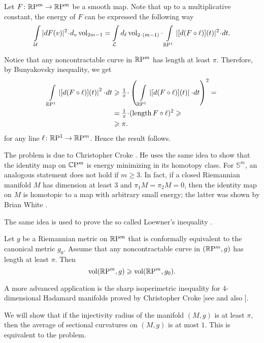 Let $F\colon\mathbb{R}\mathrm{P}^m\to\mathbb{R}\mathrm{P}^m$ be a smooth map.
Note that up to a multiplicative constant,
the energy of $F$ can be expressed the following way
\[\int\limits_{\mathcal{U}} |dF(v)|^2\cdot d_v\vol_{2m-1}
=
\int\limits_{\mathcal{L}}d_\ell\vol_{2\cdot(m-1)}\cdot\int\limits_{\RP^1} |[d(F\circ \ell)](t)|^2\cdot dt.\]

Notice that any noncontractable curve in $\mathbb{R}\mathrm{P}^m$ has length at least $\pi$.
Therefore, by Bunyakovsky inequality, we get
\begin{align*}
\int\limits_{\RP^1} \left|[d(F\circ \ell)](t)\right|^2\cdot dt&\ge 
\tfrac1\pi\cdot \left(\,\int\limits_{\RP^1} \left|[d(F\circ \ell)](t)\right|\cdot dt\right)^2=
\\
&=\tfrac1\pi\cdot (\length F\circ\ell)^2\ge
\\
&\ge \pi.
\end{align*}
for any line $\ell\colon\mathbb{R}\mathrm{P}^1\to \mathbb{R}\mathrm{P}^m$.
Hence the result follows.\qeds

\label{page:liouville}
The problem is due to Christopher Croke \cite{croke-energy}. 
He uses the same idea to show that the identity map on $\mathbb{C}\mathrm{P}^m$ is energy minimizing in its homotopy class.
For $\mathbb S^m$, an analogous statement does not hold if $m\ge 3$.
In fact, 
if a closed Riemannian manifold $M$ 
has dimension at least 3 
and $\pi_1M=\pi_2M=0$,
then the identity map on $M$ is homotopic 
to a map with arbitrary small energy;
the latter was shown by Brian White \cite{white}.

The same idea is used to prove the so called Loewner's inequality \cite{gromov-filling}.
\begin{pr}
Let $g$ be a Riemannian metric on $\mathbb{R}\mathrm{P}^m$ that is conformally equivalent to the canonical metric $g_0$.
Assume that any noncontractable curve in $(\mathbb{R}\mathrm{P}^m,g)$ has length at least $\pi$.
Then
\[\operatorname{\rm vol}\nolimits(\mathbb{R}\mathrm{P}^m,g)\geqslant\operatorname{\rm vol}\nolimits(\mathbb{R}\mathrm{P}^m,g_0).\]

\end{pr}

A more advanced application is the sharp isoperimetric inequality for 
4-dimensional Hadamard manifolds proved by Christopher Croke [see  and also ].





We will show that 
if the injectivity radius of the manifold $(M,g)$ is at least $\pi$,
then the average of sectional curvatures on $(M,g)$ is at most $1$.
This is equivalent to the problem.

